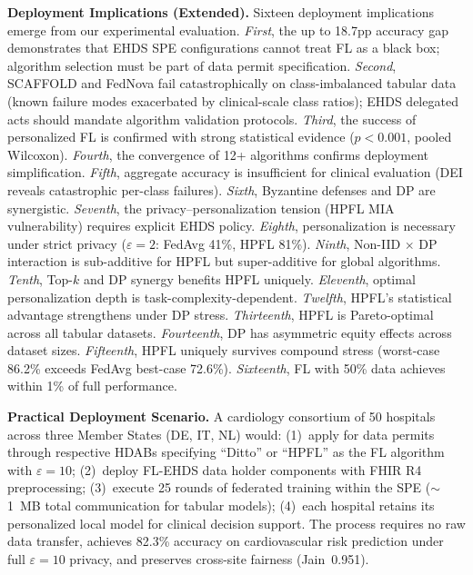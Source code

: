\documentclass[conference]{IEEEtran}
\begin{document}
\smallskip\noindent\textbf{Deployment Implications (Extended).}
Sixteen deployment implications emerge from our experimental evaluation. \textit{First}, the up to 18.7pp accuracy gap demonstrates that EHDS SPE configurations cannot treat FL as a black box; algorithm selection must be part of data permit specification. \textit{Second}, SCAFFOLD and FedNova fail catastrophically on class-imbalanced tabular data (known failure modes exacerbated by clinical-scale class ratios); EHDS delegated acts should mandate algorithm validation protocols. \textit{Third}, the success of personalized FL is confirmed with strong statistical evidence ($p < 0.001$, pooled Wilcoxon). \textit{Fourth}, the convergence of 12+ algorithms confirms deployment simplification. \textit{Fifth}, aggregate accuracy is insufficient for clinical evaluation (DEI reveals catastrophic per-class failures). \textit{Sixth}, Byzantine defenses and DP are synergistic. \textit{Seventh}, the privacy--personalization tension (HPFL MIA vulnerability) requires explicit EHDS policy. \textit{Eighth}, personalization is necessary under strict privacy ($\varepsilon{=}2$: FedAvg 41\%, HPFL 81\%). \textit{Ninth}, Non-IID $\times$ DP interaction is sub-additive for HPFL but super-additive for global algorithms. \textit{Tenth}, Top-$k$ and DP synergy benefits HPFL uniquely. \textit{Eleventh}, optimal personalization depth is task-complexity-dependent. \textit{Twelfth}, HPFL's statistical advantage strengthens under DP stress. \textit{Thirteenth}, HPFL is Pareto-optimal across all tabular datasets. \textit{Fourteenth}, DP has asymmetric equity effects across dataset sizes. \textit{Fifteenth}, HPFL uniquely survives compound stress (worst-case 86.2\% exceeds FedAvg best-case 72.6\%). \textit{Sixteenth}, FL with 50\% data achieves within 1\% of full performance.

\smallskip\noindent\textbf{Practical Deployment Scenario.}
A cardiology consortium of 50 hospitals across three Member States (DE, IT, NL) would: (1)~apply for data permits through respective HDABs specifying ``Ditto'' or ``HPFL'' as the FL algorithm with $\varepsilon{=}10$; (2)~deploy FL-EHDS data holder components with FHIR R4 preprocessing; (3)~execute 25 rounds of federated training within the SPE ($\sim$1~MB total communication for tabular models); (4)~each hospital retains its personalized local model for clinical decision support. The process requires no raw data transfer, achieves 82.3\% accuracy on cardiovascular risk prediction under full $\varepsilon{=}10$ privacy, and preserves cross-site fairness (Jain~0.951).
\end{document}
